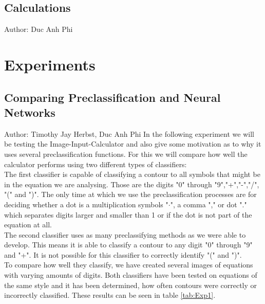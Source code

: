 \documentclass[12pt]{article}
\begin{document}
	\subsection{Calculations}
	\small{Author: Duc Anh Phi} \newline \newline
	
	\section{Experiments}
	\subsection{Comparing Preclassification and Neural Networks}
	\small{Author: Timothy Jay Herbst, Duc Anh Phi} \newline \newline
	In the following experiment we will be testing the Image-Input-Calculator and also give some motivation as to why it uses several preclassification functions.
	For this we will compare how well the calculator performs using two different types of classifiers:\\
	The first classifier is capable of classifying a contour to all symbols that might be in the equation we are analysing.
	Those are the digits "0" through "9","+","-","/", "(" and ")".
	The only time at which we use the preclassification processes are for deciding whether a dot is a multiplication symbols "$\cdot$", a comma "," or dot "." which separates digits larger and smaller than 1 or if the dot is not part of the equation at all.\\
	The second classifier uses as many preclassifying methods as we were able to develop.
	This means it is able to classify a contour to any digit "0" through "9" and "+".
	It is not possible for this classifier to correctly identify "(" and ")".\\ %
	To compare how well they classify, we have created several images of equations with varying amounts of digits.
	Both classifiers have been tested on equations of the same style and it has been determined, how often contours were correctly or incorrectly classified.
	These results can be seen in table \ref{tab:Exp1}.
	
	
	
\end{document}
